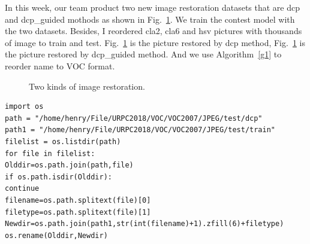 \documentclass[a4paper]{article}
\begin{document}
In this week, our team product two new image restoration datasets that are dcp and dcp\_guided mothods as shown in Fig.~\ref{p1}. We train the contest model with the two datasets. Besides, I reordered cla2, cla6 and hsv pictures with thousands of image to train and test. Fig.~\ref{p1} is the picture restored by dcp method, Fig.~\ref{p1} is the picture restored by dcp\_guided method. And we use Algorithm~\ref{g1} to reorder name to VOC format.
\begin{figure}
	\centering 
	\caption{Two kinds of image restoration.} 
	\label{p1} %
\end{figure}

\lstset{language=python}
\begin{lstlisting}
import os
path = "/home/henry/File/URPC2018/VOC/VOC2007/JPEG/test/dcp"
path1 = "/home/henry/File/URPC2018/VOC/VOC2007/JPEG/test/train"
filelist = os.listdir(path)
for file in filelist: 
Olddir=os.path.join(path,file)  
if os.path.isdir(Olddir):   
continue
filename=os.path.splitext(file)[0]   
filetype=os.path.splitext(file)[1] 
Newdir=os.path.join(path1,str(int(filename)+1).zfill(6)+filetype) 
os.rename(Olddir,Newdir)
\end{lstlisting}\label{g1}
\end{document}
